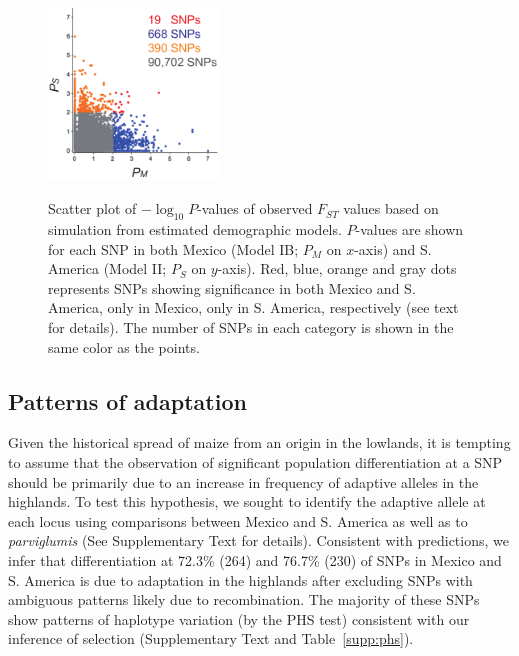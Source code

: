 \begin{figure}[tb]   
  \begin{center}
   \vspace{-0mm}
   \includegraphics[width=0.4\textwidth]{fig/Fig6}
   \renewcommand{\baselinestretch}{0.9}
   \vspace{-3mm}
   \caption{Scatter plot of $-\log_10 P$-values of observed $F_{ST}$ values based on simulation from estimated demographic models. $P$-values are shown for each SNP in both Mexico (Model IB; $P_M$ on $x$-axis) and S. America (Model II; $P_S$ on $y$-axis).  
   Red, blue, orange and gray dots represents SNPs showing significance in both Mexico and S. America, only in Mexico, only in S. America, respectively (see text for details).
   The number of SNPs in each category is shown in the same color as the points.} 
\vspace{-6mm}
    \label{PvDist}
  \end{center}
\end{figure}

\subsection*{Patterns of adaptation}

Given the historical spread of maize from an origin in the lowlands, it is tempting to assume that the observation of significant population differentiation at a SNP should be primarily due to an increase in frequency of adaptive alleles in the highlands.
To test this hypothesis, we sought to identify the adaptive allele at each locus using comparisons between Mexico and S. America as well as to \emph{parviglumis} (See Supplementary Text  for details).  
Consistent with predictions, we infer that differentiation at 72.3\% (264) and 76.7\% (230) of SNPs in Mexico and S. America is due to adaptation in the highlands after excluding  SNPs with ambiguous patterns likely due to recombination. 
The majority of these SNPs show patterns of haplotype variation (by the PHS test) consistent with our inference of selection (Supplementary Text and Table~\ref{supp:phs}).
   
